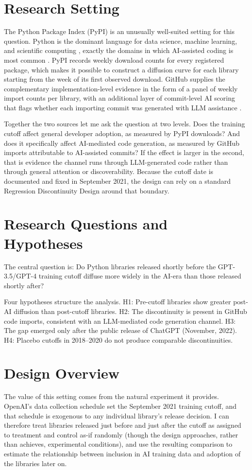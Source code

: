 \documentclass[12pt, a4paper]{report}
\begin{document}
\section{Research Setting}\label{sec:intro-setting}
The Python Package Index (PyPI) is an unusually well-suited setting for this question. Python is the dominant language for data science, machine learning, and scientific computing \citep{stackoverflow2024survey}, exactly the domains in which AI-assisted coding is most common \citep{daniotti2025who}. PyPI records weekly download counts for every registered package, which makes it possible to construct a diffusion curve for each library starting from the week of its first observed download. GitHub supplies the complementary implementation-level evidence in the form of a panel of weekly import counts per library, with an additional layer of commit-level AI scoring that flags whether each importing commit was generated with LLM assistance \citep{daniotti2025who}.

Together the two sources let me ask the question at two levels. Does the training cutoff affect general developer adoption, as measured by PyPI downloads? And does it specifically affect AI-mediated code generation, as measured by GitHub imports attributable to AI-assisted commits? If the effect is larger in the second, that is evidence the channel runs through LLM-generated code rather than through general attention or discoverability. Because the cutoff date is documented and fixed in September 2021, the design can rely on a standard Regression Discontinuity Design around that boundary.

\section{Research Questions and Hypotheses}\label{sec:intro-hypotheses}
The central question is: Do Python libraries released shortly before the GPT-3.5/GPT-4 training cutoff diffuse more widely in the AI-era than those released shortly after?

Four hypotheses structure the analysis. H1: Pre-cutoff libraries show greater post-AI diffusion than post-cutoff libraries. H2: The discontinuity is present in GitHub code imports, consistent with an LLM-mediated code generation channel. H3: The gap emerged only after the public release of ChatGPT (November, 2022). H4: Placebo cutoffs in 2018--2020 do not produce comparable discontinuities.

\section{Design Overview}\label{sec:intro-design}
The value of this setting comes from the natural experiment it provides. OpenAI's data collection schedule set the September 2021 training cutoff, and that schedule is exogenous to any individual library's release decision. I can therefore treat libraries released just before and just after the cutoff as assigned to treatment and control as-if randomly (though the design approaches, rather than achieves, experimental conditions), and use the resulting comparison to estimate the relationship between inclusion in AI training data and adoption of the libraries later on.
\end{document}

